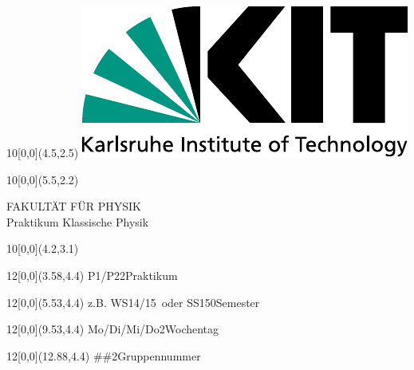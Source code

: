 \newcommand{\diameter}{20}
\newcommand{\xone}{-15}
\newcommand{\xtwo}{160}
\newcommand{\yone}{15}
\newcommand{\ytwo}{-253}

\newcommand{\hoehea}{60}
\newcommand{\hoeheb}{60}




\begin{titlepage}
    
    \begin{textblock}{10}[0,0](4.5,2.5)
        \includegraphics[width=.25\textwidth]{../praktikum-protokollvorlage-latex/include/kitlogo.pdf}
    \end{textblock}
    \begin{textblock}{10}[0,0](5.5,2.2)
        \begin{flushright}
            \Large FAKULTÄT FÜR PHYSIK\\Praktikum Klassische Physik
        \end{flushright}
    \end{textblock}
    
    \begin{textblock}{10}[0,0](4.2,3.1)
    \end{textblock}
    
    \Large
    \begin{textblock}{12}[0,0](3.58,4.4)
                    {P1/P2}{2}{Praktikum}
    \end{textblock}
    \begin{textblock}{12}[0,0](5.53,4.4)
        {z.B. \glqq WS14/15\grqq\ oder \glqq SS15\grqq}{0}{Semester}
    \end{textblock}
    \begin{textblock}{12}[0,0](9.53,4.4)
                    {Mo/Di/Mi/Do}{2}{Wochentag}
    \end{textblock}
    \begin{textblock}{12}[0,0](12.88,4.4)
                   {\#\#}{2}{Gruppennummer}
    \end{textblock}
    

\end{titlepage}
